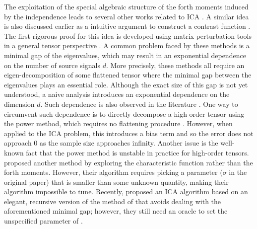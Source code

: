 \documentclass[jmlr]{article}
\newcommand{\todoa}[2][]{ \todo[color=Purple!20,size=\tiny,#1]{#2}} %
\theoremstyle{definition}
\begin{document}
The exploitation of the special algebraic structure of the forth moments induced by the independence leads to several other works related to ICA \citep{hsu2013learning,goyal2014fourier,vempala2014max}. 
A similar idea is also discussed earlier as a intuitive argument to construct a contrast function \citep{cardoso1999high}. 
The first rigorous proof for this idea is developed using matrix perturbation tools in a general tensor perspective \citep{goyal2014fourier}. 
A common problem faced by these methods is a minimal gap of the eigenvalues, which may result in an exponential dependence on the number of source signals $d$.
More precisely, these methods all require an eigen-decomposition of some flattened tensor where the minimal gap between the eigenvalues plays an essential role. 
Although the exact size of this gap is not yet understood, a naive analysis introduces an exponential dependence on the dimension $d$. 
Such dependence is also observed in the literature \citep{cardoso1999high,goyal2014fourier}.
One way to circumvent such dependence is to directly decompose a high-order tensor using the power method, which requires no flattening procedure \citep{anandkumar2014guaranteed}. 
However, when applied to the ICA problem, this introduces a bias term and so the error does not approach 0 as the sample size approaches infinity.
Another issue is the well-known fact that the power method is unstable in practice for high-order tensors. 
\citet{goyal2014fourier} proposed another method by exploring the characteristic function rather than the forth moments.
However, their algorithm requires picking a parameter ($\sigma$ in the original paper) that is smaller than some unknown quantity, making their algorithm impossible to tune.
Recently, \citet{vempala2014max} proposed an ICA algorithm based on an elegant, recursive version of the method of \citet{goyal2014fourier} that avoids dealing with the aforementioned minimal gap; however, they still need an oracle to set the unspecified parameter of \citet{goyal2014fourier}.
\end{document}
